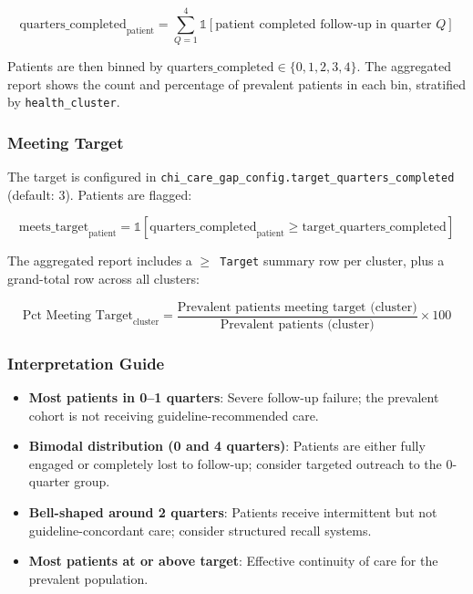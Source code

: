 \documentclass[11pt,a4paper]{article}
\begin{document}
\begin{equation}
\text{quarters\_completed}_{\text{patient}} = \sum_{Q=1}^{4} \mathbb{1}[\text{patient completed follow-up in quarter } Q]
\end{equation}

Patients are then binned by $\text{quarters\_completed} \in \{0, 1, 2, 3, 4\}$. The aggregated report shows the count and percentage of prevalent patients in each bin, stratified by \texttt{health\_cluster}.

\subsubsection{Meeting Target}

The target is configured in \texttt{chi\_care\_gap\_config.target\_quarters\_completed} (default: 3). Patients are flagged:

\begin{equation}
\text{meets\_target}_{\text{patient}} = \mathbb{1}[\text{quarters\_completed}_{\text{patient}} \geq \text{target\_quarters\_completed}]
\end{equation}

The aggregated report includes a \texttt{$\geq$ Target} summary row per cluster, plus a grand-total row across all clusters:

\begin{equation}
\text{Pct Meeting Target}_{\text{cluster}} =
\frac{\text{Prevalent patients meeting target (cluster)}}
     {\text{Prevalent patients (cluster)}} \times 100
\end{equation}

\subsubsection{Interpretation Guide}

\begin{itemize}[leftmargin=*]
    \item \textbf{Most patients in 0--1 quarters}: Severe follow-up failure; the prevalent cohort is not receiving guideline-recommended care.
    \item \textbf{Bimodal distribution (0 and 4 quarters)}: Patients are either fully engaged or completely lost to follow-up; consider targeted outreach to the 0-quarter group.
    \item \textbf{Bell-shaped around 2 quarters}: Patients receive intermittent but not guideline-concordant care; consider structured recall systems.
    \item \textbf{Most patients at or above target}: Effective continuity of care for the prevalent population.
\end{itemize}
\end{document}

